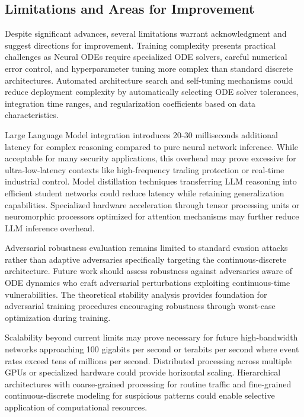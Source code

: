 \documentclass[10pt,journal,compsoc]{IEEEtran}
\begin{document}
\subsection{Limitations and Areas for Improvement}

Despite significant advances, several limitations warrant acknowledgment and suggest directions for improvement. Training complexity presents practical challenges as Neural ODEs require specialized ODE solvers, careful numerical error control, and hyperparameter tuning more complex than standard discrete architectures. Automated architecture search and self-tuning mechanisms could reduce deployment complexity by automatically selecting ODE solver tolerances, integration time ranges, and regularization coefficients based on data characteristics.

Large Language Model integration introduces 20-30 milliseconds additional latency for complex reasoning compared to pure neural network inference. While acceptable for many security applications, this overhead may prove excessive for ultra-low-latency contexts like high-frequency trading protection or real-time industrial control. Model distillation techniques transferring LLM reasoning into efficient student networks could reduce latency while retaining generalization capabilities. Specialized hardware acceleration through tensor processing units or neuromorphic processors optimized for attention mechanisms may further reduce LLM inference overhead.

Adversarial robustness evaluation remains limited to standard evasion attacks rather than adaptive adversaries specifically targeting the continuous-discrete architecture. Future work should assess robustness against adversaries aware of ODE dynamics who craft adversarial perturbations exploiting continuous-time vulnerabilities. The theoretical stability analysis provides foundation for adversarial training procedures encouraging robustness through worst-case optimization during training.

Scalability beyond current limits may prove necessary for future high-bandwidth networks approaching 100 gigabits per second or terabits per second where event rates exceed tens of millions per second. Distributed processing across multiple GPUs or specialized hardware could provide horizontal scaling. Hierarchical architectures with coarse-grained processing for routine traffic and fine-grained continuous-discrete modeling for suspicious patterns could enable selective application of computational resources.
\end{document}
